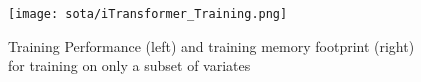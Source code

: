 \documentclass[class=scrbook, crop=false]{standalone}
\begin{document}
\begin{figure}[ht]
            \centering
            \texttt{[image: sota/iTransformer\_Training.png]}
            \caption[Training Performance (left) and training memory footprint (right) for training on only a subset of variates \cite{liuITransformerInvertedTransformers2023}]{Training Performance (left) and training memory footprint (right) for training on only a subset of variates \cite{liuITransformerInvertedTransformers2023}}
            \label{fig::iTransformer_Training}
 \end{figure}
\end{document}
